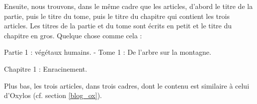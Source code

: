 \documentclass[french]{report}
\theoremstyle{plain}
\begin{document}
			Ensuite, nous trouvons, dans le même cadre que les articles, d'abord le titre de la partie, puis le titre du tome, puis le titre du chapitre qui contient les trois articles. Les titres de la partie et du tome sont écrits en petit et le titre du chapitre en gros. Quelque chose comme cela :

			\phantom{lulz}

			Partie 1 : végétaux humains. - Tome 1 : De l'arbre sur la montagne.

			\phantom{lulz}

			\begin{huge}\begin{bfseries} Chapitre 1 : Enracinement. \end{bfseries} \end{huge}

			\phantom{lulz}

			Plus bas, les trois articles, dans trois cadres, dont le contenu est similaire à celui d'Oxylos (cf. section \ref{blog_ox}).
\end{document}

